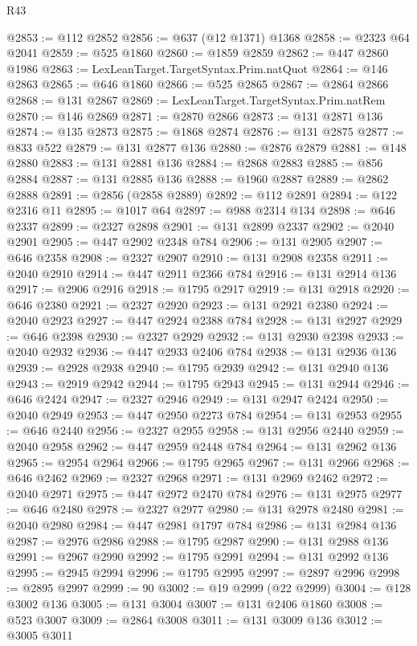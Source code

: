 \begin{lexlean}{R43}
\begin{coremodule}
@2853 := @112 @2852
@2856 := @637 (@12 @1371) @1368
@2858 := @2323 @64 @2041
@2859 := @525 @1860
@2860 := @1859 @2859
@2862 := @447 @2860 @1986
@2863 := LexLeanTarget.TargetSyntax.Prim.natQuot
@2864 := @146 @2863
@2865 := @646 @1860
@2866 := @525 @2865
@2867 := @2864 @2866
@2868 := @131 @2867
@2869 := LexLeanTarget.TargetSyntax.Prim.natRem
@2870 := @146 @2869
@2871 := @2870 @2866
@2873 := @131 @2871 @136
@2874 := @135 @2873
@2875 := @1868 @2874
@2876 := @131 @2875
@2877 := @833 @522
@2879 := @131 @2877 @136
@2880 := @2876 @2879
@2881 := @148 @2880
@2883 := @131 @2881 @136
@2884 := @2868 @2883
@2885 := @856 @2884
@2887 := @131 @2885 @136
@2888 := @1960 @2887
@2889 := @2862 @2888
@2891 := @2856 (@2858 @2889)
@2892 := @112 @2891
@2894 := @122 @2316 @11
@2895 := @1017 @64
@2897 := @988 @2314 @134
@2898 := @646 @2337
@2899 := @2327 @2898
@2901 := @131 @2899 @2337
@2902 := @2040 @2901
@2905 := @447 @2902 @2348 @784
@2906 := @131 @2905
@2907 := @646 @2358
@2908 := @2327 @2907
@2910 := @131 @2908 @2358
@2911 := @2040 @2910
@2914 := @447 @2911 @2366 @784
@2916 := @131 @2914 @136
@2917 := @2906 @2916
@2918 := @1795 @2917
@2919 := @131 @2918
@2920 := @646 @2380
@2921 := @2327 @2920
@2923 := @131 @2921 @2380
@2924 := @2040 @2923
@2927 := @447 @2924 @2388 @784
@2928 := @131 @2927
@2929 := @646 @2398
@2930 := @2327 @2929
@2932 := @131 @2930 @2398
@2933 := @2040 @2932
@2936 := @447 @2933 @2406 @784
@2938 := @131 @2936 @136
@2939 := @2928 @2938
@2940 := @1795 @2939
@2942 := @131 @2940 @136
@2943 := @2919 @2942
@2944 := @1795 @2943
@2945 := @131 @2944
@2946 := @646 @2424
@2947 := @2327 @2946
@2949 := @131 @2947 @2424
@2950 := @2040 @2949
@2953 := @447 @2950 @2273 @784
@2954 := @131 @2953
@2955 := @646 @2440
@2956 := @2327 @2955
@2958 := @131 @2956 @2440
@2959 := @2040 @2958
@2962 := @447 @2959 @2448 @784
@2964 := @131 @2962 @136
@2965 := @2954 @2964
@2966 := @1795 @2965
@2967 := @131 @2966
@2968 := @646 @2462
@2969 := @2327 @2968
@2971 := @131 @2969 @2462
@2972 := @2040 @2971
@2975 := @447 @2972 @2470 @784
@2976 := @131 @2975
@2977 := @646 @2480
@2978 := @2327 @2977
@2980 := @131 @2978 @2480
@2981 := @2040 @2980
@2984 := @447 @2981 @1797 @784
@2986 := @131 @2984 @136
@2987 := @2976 @2986
@2988 := @1795 @2987
@2990 := @131 @2988 @136
@2991 := @2967 @2990
@2992 := @1795 @2991
@2994 := @131 @2992 @136
@2995 := @2945 @2994
@2996 := @1795 @2995
@2997 := @2897 @2996
@2998 := @2895 @2997
@2999 := 90
@3002 := @19 @2999 (@22 @2999)
@3004 := @128 @3002 @136
@3005 := @131 @3004
@3007 := @131 @2406 @1860
@3008 := @523 @3007
@3009 := @2864 @3008
@3011 := @131 @3009 @136
@3012 := @3005 @3011

\end{coremodule}
\end{lexlean}

